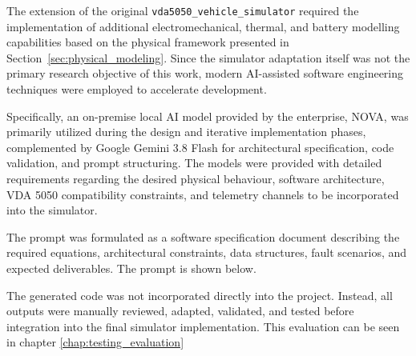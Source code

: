 The extension of the original \texttt{vda5050\_vehicle\_simulator} required the implementation of additional electromechanical, thermal, and battery modelling capabilities based on the physical framework presented in Section~\ref{sec:physical_modeling}. Since the simulator adaptation itself was not the primary research objective of this work, modern AI-assisted software engineering techniques were employed to accelerate development. 

Specifically, an on-premise local AI model provided by the enterprise, NOVA, was primarily utilized during the design and iterative implementation phases, complemented by Google Gemini 3.8 Flash for architectural specification, code validation, and prompt structuring. The models were provided with detailed requirements regarding the desired physical behaviour, software architecture, VDA 5050 compatibility constraints, and telemetry channels to be incorporated into the simulator. 

The prompt was formulated as a software specification document describing the required equations, architectural constraints, data structures, fault scenarios, and expected deliverables. The prompt is shown below. 

The generated code was not incorporated directly into the project. Instead, all outputs were manually reviewed, adapted, validated, and tested before integration into the final simulator implementation.
This evaluation can be seen in chapter \ref{chap:testing_evaluation}

